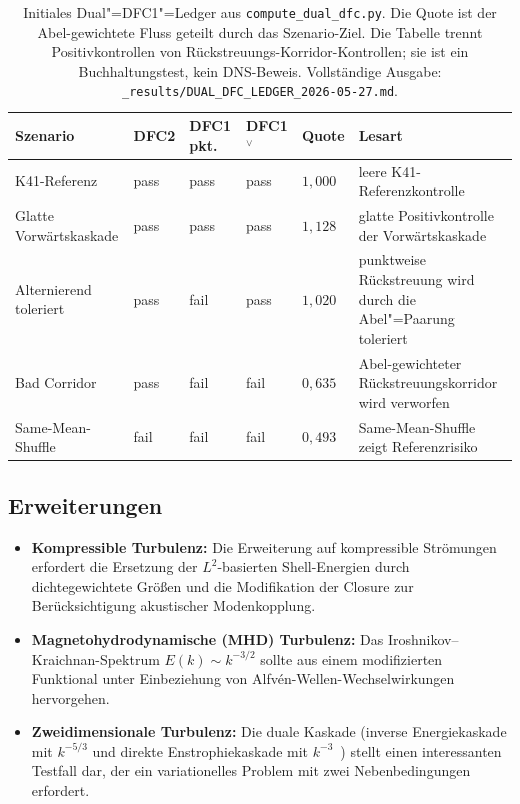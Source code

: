 \documentclass[12pt,a4paper]{article}
\theoremstyle{breakdef}
\theoremstyle{breakplain}
\theoremstyle{breakdef}
\begin{document}
\begin{table}[htbp]
\centering
\footnotesize
\setlength{\tabcolsep}{3.5pt}
\renewcommand{\arraystretch}{1.15}
\begin{tabularx}{\textwidth}{>{\raggedright\arraybackslash}p{2.6cm} >{\centering\arraybackslash}p{1.0cm} >{\centering\arraybackslash}p{1.05cm} >{\centering\arraybackslash}p{1.25cm} >{\centering\arraybackslash}p{1.15cm} Y}
\toprule
Szenario & DFC2 & DFC1 pkt. & DFC1$^\vee$ & Quote & Lesart \\
\midrule
K41-Referenz & pass & pass & pass & $1{,}000$ & leere K41-Referenzkontrolle \\
\addlinespace[2pt]
Glatte Vorwärtskaskade & pass & pass & pass & $1{,}128$ & glatte Positivkontrolle der Vorwärtskaskade \\
\addlinespace[2pt]
Alternierend toleriert & pass & fail & pass & $1{,}020$ & punktweise Rückstreuung wird durch die Abel"=Paarung toleriert \\
\addlinespace[2pt]
Bad Corridor & pass & fail & fail & $0{,}635$ & Abel-gewichteter Rückstreuungskorridor wird verworfen \\
\addlinespace[2pt]
Same-Mean-Shuffle & fail & fail & fail & $0{,}493$ & Same-Mean-Shuffle zeigt Referenzrisiko \\
\bottomrule
\end{tabularx}
\caption{Initiales Dual"=DFC1"=Ledger aus \texttt{compute\_dual\_dfc.py}. Die Quote ist der Abel-gewichtete Fluss geteilt durch das Szenario-Ziel. Die Tabelle trennt Positivkontrollen von Rückstreuungs-Korridor-Kontrollen; sie ist ein Buchhaltungstest, kein DNS-Beweis. Vollständige Ausgabe: \texttt{\_results/DUAL\_DFC\_LEDGER\_2026-05-27.md}.}
\label{tab:dual-dfc-ledger}
\end{table}

\subsection{Erweiterungen}

\begin{itemize}
  \item \textbf{Kompressible Turbulenz:}
    Die Erweiterung auf kompressible Strömungen erfordert die Ersetzung
    der $L^2$-basierten Shell-Energien durch dichtegewichtete Größen
    und die Modifikation der Closure zur Berücksichtigung akustischer
    Modenkopplung.
  \item \textbf{Magnetohydrodynamische (MHD) Turbulenz:}
    Das Iroshnikov--Kraichnan-Spektrum $E(k) \sim k^{-3/2}$ sollte aus
    einem modifizierten Funktional unter Einbeziehung von
    Alfvén-Wellen-Wechselwirkungen hervorgehen.
  \item \textbf{Zweidimensionale Turbulenz:}
    Die duale Kaskade (inverse Energiekaskade mit $k^{-5/3}$ und direkte
    Enstrophiekaskade mit $k^{-3}$~\cite{Kraichnan67}) stellt einen
    interessanten Testfall dar, der ein variationelles Problem mit zwei
    Nebenbedingungen erfordert.
\end{itemize}
\end{document}

